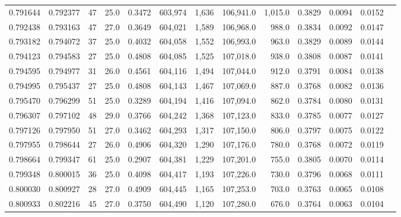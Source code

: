\begin{tabular}{rrrrrrrrrrrrr}
0.791644 & 0.792377 &    47 & 25.0 &                                     0.3472 & 603,974 &   1,636 & 106,941.0 &   1,015.0 & 0.3829 & 0.0094 & 0.0152 \\
0.792438 & 0.793163 &    47 & 27.0 &                                     0.3649 & 604,021 &   1,589 & 106,968.0 &     988.0 & 0.3834 & 0.0092 & 0.0147 \\
0.793182 & 0.794072 &    37 & 25.0 &                                     0.4032 & 604,058 &   1,552 & 106,993.0 &     963.0 & 0.3829 & 0.0089 & 0.0144 \\
0.794123 & 0.794583 &    27 & 25.0 &                                     0.4808 & 604,085 &   1,525 & 107,018.0 &     938.0 & 0.3808 & 0.0087 & 0.0141 \\
0.794595 & 0.794977 &    31 & 26.0 &                                     0.4561 & 604,116 &   1,494 & 107,044.0 &     912.0 & 0.3791 & 0.0084 & 0.0138 \\
0.794995 & 0.795437 &    27 & 25.0 &                                     0.4808 & 604,143 &   1,467 & 107,069.0 &     887.0 & 0.3768 & 0.0082 & 0.0136 \\
0.795470 & 0.796299 &    51 & 25.0 &                                     0.3289 & 604,194 &   1,416 & 107,094.0 &     862.0 & 0.3784 & 0.0080 & 0.0131 \\
0.796307 & 0.797102 &    48 & 29.0 &                                     0.3766 & 604,242 &   1,368 & 107,123.0 &     833.0 & 0.3785 & 0.0077 & 0.0127 \\
0.797126 & 0.797950 &    51 & 27.0 &                                     0.3462 & 604,293 &   1,317 & 107,150.0 &     806.0 & 0.3797 & 0.0075 & 0.0122 \\
0.797955 & 0.798644 &    27 & 26.0 &                                     0.4906 & 604,320 &   1,290 & 107,176.0 &     780.0 & 0.3768 & 0.0072 & 0.0119 \\
0.798664 & 0.799347 &    61 & 25.0 &                                     0.2907 & 604,381 &   1,229 & 107,201.0 &     755.0 & 0.3805 & 0.0070 & 0.0114 \\
0.799348 & 0.800015 &    36 & 25.0 &                                     0.4098 & 604,417 &   1,193 & 107,226.0 &     730.0 & 0.3796 & 0.0068 & 0.0111 \\
0.800030 & 0.800927 &    28 & 27.0 &                                     0.4909 & 604,445 &   1,165 & 107,253.0 &     703.0 & 0.3763 & 0.0065 & 0.0108 \\
0.800933 & 0.802216 &    45 & 27.0 &                                     0.3750 & 604,490 &   1,120 & 107,280.0 &     676.0 & 0.3764 & 0.0063 & 0.0104 \\

\end{tabular}
